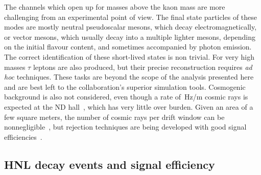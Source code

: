 The channels which open up for masses above the kaon mass are more challenging from an experimental point of view.
The final state particles of these modes are mostly neutral pseudoscalar mesons, which decay electromagnetically, %
or vector mesons, which usually decay into a multiple lighter mesons, depending on the initial flavour content,
and sometimes accompanied by photon emission.
The correct identification of these short-lived states is non trivial.
For very high masses $\tau$ leptons are also produced, but their precise reconstruction requires \emph{ad hoc} techniques.
These tasks are beyond the scope of the analysis presented here and are best left to the collaboration's superior simulation tools.
Cosmogenic background is also not considered, even though a rate of \,Hz/m cosmic rays %
is expected at the ND hall~\cite{Abi:2020wmh}, which has very little over burden.
Given an area of a few square meters, the number of cosmic rays per drift window can be nonnegligible~\cite{Abi:2018dnh}, %
but rejection techniques are being developed with good signal efficiencies~\cite{Adams:2018lzd}.


%
\subsection{HNL decay events and signal efficiency}
\label{sec:numevt}

